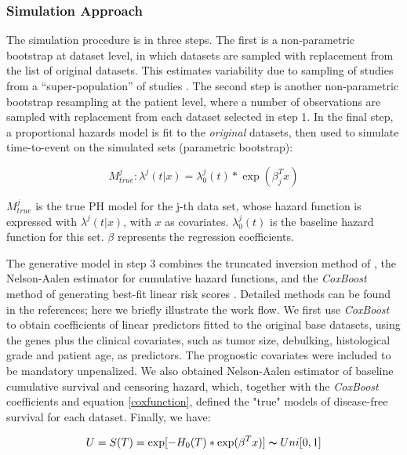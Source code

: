 \documentclass{bioinfo}
\begin{document}
    \subsubsection{Simulation Approach}
    The simulation procedure is in three steps. The first is a non-parametric
    bootstrap at dataset level, in which datasets are sampled with
    replacement from the list of original datasets. This
    estimates variability due to sampling of studies from a
    ``super-population'' of studies \citep{Hartley1975-bj}.  The
    second step is another
    non-parametric bootstrap resampling at the patient
    level, where a number of observations are sampled with replacement from
    each dataset selected in step 1.
    In the final step, a proportional hazards model is fit to the \emph{original} datasets, then used to
    simulate time-to-event on the simulated sets (parametric
    bootstrap):

    \begin{equation}\label{coxfunction}
      M^{j}_{true} : \lambda^{j}(t|x) = \lambda^{j}_{0}(t) * \exp(\beta_{j}^{T}x)
    \end{equation}

    $M^{j}_{true}$ is the true PH model for the j-th data set,
    whose hazard function is expressed with $\lambda^{j}(t|x)$,
    with $x$ as covariates. $\lambda^{j}_{0}(t)$ is the baseline
    hazard function for this set. $\beta$ represents the regression
    coefficients.

    The generative model in step 3 combines the truncated inversion
    method of \citet{Bender2005}, the Nelson-Aalen estimator
    \citep{Nelson1969,Nelson1972,Aalen1978}
    for cumulative hazard functions, and the \emph{CoxBoost} method of
    generating best-fit linear risk scores
    \citep{Binder2008}. Detailed methods can be found in the references;
    here we briefly illustrate the work flow. We first
    use \emph{CoxBoost} to obtain coefficients of linear predictors
    fitted to the original base datasets, using the genes plus the 
    clinical covariates, such as
    tumor size, debulking, histological grade and patient age, as predictors.
    The prognostic covariates were included to be mandatory unpenalized.
    We also obtained Nelson-Aalen estimator of baseline cumulative survival and
    censoring hazard, which, together with the \emph{CoxBoost}
    coefficients and equation \ref{coxfunction}, defined the "true"
    models of disease-free survival for each dataset.  Finally, we have:

    \begin{equation}\label{uniformrv}
      U = S(T) = \exp[-H_{0}(T) * \exp(\beta^{T}x)] \thicksim Uni[0,1]
    \end{equation}
\end{document}
